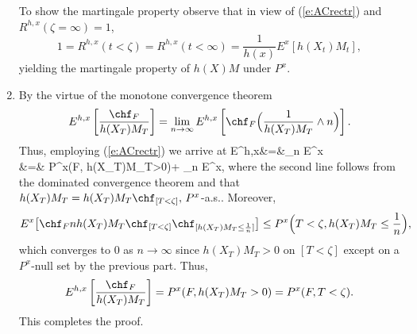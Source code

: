 \documentclass[11pt,reqno]{amsart}
\numberwithin{equation}{section}
\def\rar{\rightarrow}
\begin{document}
\begin{enumerate}[leftmargin=*]
		To show the martingale property observe that in view of (\ref{e:ACrectr}) and $R^{h,x}(\zeta=\infty)=1$,
		\[
		1=R^{h,x}(t<\zeta)=R^{h,x}(t<\infty)=\frac{1}{h(x)}E^x[h(X_t)M_t],
		\]
		yielding the martingale property of $h(X)M$ under $P^x$.
		\item  By the virtue of the monotone convergence theorem
		\[
		E^{h,x}\left[\frac{\chf_F}{h(X_T)M_T}\right]=\lim_{n \rar \infty}E^{h,x}\left[\chf_F\Big(\frac{1}{h(X_T)M_T}\wedge n\Big)\right].
		\]
		Thus, employing (\ref{e:ACrectr})  we arrive at
		\bean
		E^{h,x}&=&\lim_{n \rar \infty} E^x\\
		&=& P^x(F, h(X_T)M_T>0)+  \lim_{n \rar \infty} E^x,
		\eean
		where the second line follows from the dominated convergence theorem and that $h(X_T)M_T=h(X_T)M_T\chf_{[T<\zeta]}, \,P^x$-a.s.. Moreover,
		\[
		E^x\big[\chf_F nh(X_T)M_T\chf_{[T<\zeta]}\chf_{[h(X_T)M_T\leq \frac{1}{n}]}\big]\leq P^x\Big(T<\zeta,h(X_T)M_T \leq \frac{1}{n}\Big),
		\]
		which converges to $0$ as $n \rar \infty$ since $h(X_T)M_T>0$ on $[T<\zeta]$ except on a $P^x$-null set by the previous part. Thus,
		\[
		E^{h,x}\left[\frac{\chf_F}{h(X_T)M_T}\right]=P^x(F, h(X_T)M_T>0)=P^x(F, T<\zeta).
		\]
		This completes the proof.
		
	\end{enumerate}
\end{document}

